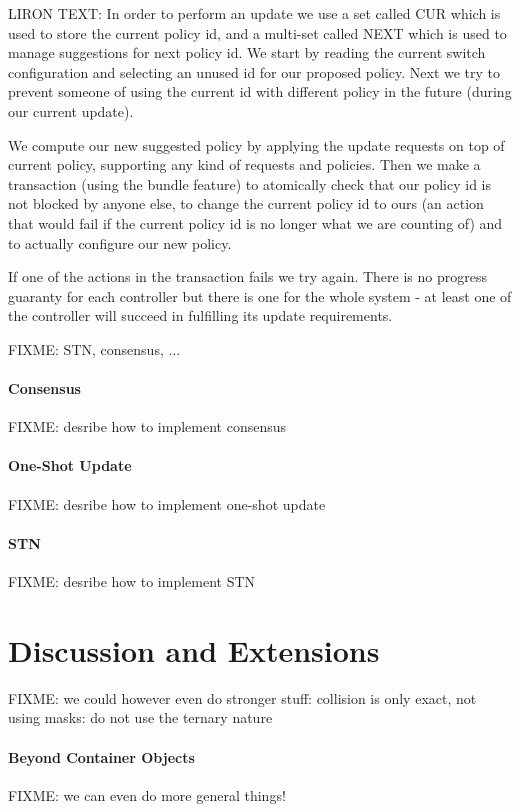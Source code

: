 \documentclass[conference]{sigcomm-alternate}
\begin{document}
LIRON TEXT: 
In order to perform an update we use a set called CUR which is used to store the current policy id, and a multi-set called NEXT which is used to manage suggestions for next policy id. We start by reading the current switch configuration and selecting an unused id for our proposed policy. Next we try to prevent someone of using the current id with different policy in the future (during our current update).

We compute our new suggested policy by applying the update requests on top of current policy, supporting any kind of requests and policies. Then we make a transaction (using the bundle feature) to atomically check that our policy id is not blocked by anyone else, to change the current policy id to ours (an action that would fail if the current policy id is no longer what we are counting of) and to actually configure our new policy.

If one of the actions in the transaction fails we try again. There is no progress guaranty for each controller but there is one for the whole system - at least one of the controller will succeed in fulfilling its update requirements.



FIXME: STN, consensus, ...

\paragraph{Consensus} FIXME: desribe how to implement consensus

\paragraph{One-Shot Update} FIXME: desribe how to implement one-shot update

\paragraph{STN} FIXME: desribe how to implement STN

\section{Discussion and Extensions}\label{sec:discussion}

FIXME: we could however even do stronger stuff: collision is only exact, not using masks: do not use the ternary nature

\paragraph{Beyond Container Objects}
FIXME: we can even do more general things!
\end{document}
